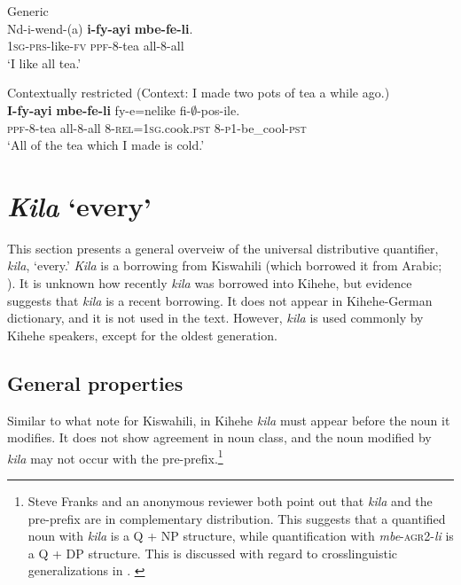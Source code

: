 \documentclass[output=paper,modfonts,nonflat]{langsci/langscibook}
\begin{document}
\begin{exe}

\ex \begin{xlist} \label{ex:kaspercushman:drinktea}
\ex Generic\\
\gll Nd-i-wend-(a) \textbf{i-fy-ayi} \textbf{mbe-fe-li}. \\
\textsc{1sg}-\textsc{prs}-like-\textsc{fv} \textsc{ppf}-8-tea all-8-all \\
\glt `I like all tea.'

\ex Contextually restricted (Context: I made two pots of tea a while ago.)\\
\gll \textbf{I-fy-ayi} \textbf{mbe-fe-li} fy-e=nelike fi-$\emptyset$-pos-ile. \\
\textsc{ppf}-8-tea all-8-all 8-\textsc{rel}=\textsc{1sg}.cook.\textsc{pst} 8-\textsc{p1}-be\_cool-\textsc{pst} \\
\glt `All of the tea which I made is cold.' 

\end{xlist}
\end{exe}



\section{\emph{Kila} `every'} \label{sec:kaspercushman:every}\label{sec:kasper:3}
This section presents a general overveiw of the universal distributive quantifier, \textit{kila}, `every.' \textit{Kila} is a borrowing from Kiswahili (which borrowed it from Arabic; \citealt{zerbian08}). It is unknown how recently \textit{kila} was borrowed into Kihehe, but evidence suggests that \textit{kila} is a recent borrowing. It does not appear in  Kihehe-German dictionary, and it is not used in the \citeauthor{Luwuko2011} text. However, \textit{kila} is used commonly by Kihehe speakers, except for the oldest generation.

\subsection{General properties}

Similar to what \cite{zerbian08} note for Kiswahili, in Kihehe \textit{kila} must appear before the noun it modifies. It does not show agreement in noun class, and the noun modified by \textit{kila} may not occur with the pre-prefix.\footnote{Steve
    Franks and an anonymous reviewer both point out that \textit{kila} and the pre-prefix are in complementary distribution.  This suggests that a quantified noun with \textit{kila} is a Q + NP structure, while quantification with \textit{mbe}-\textsc{agr2}-\textit{li} is a Q + DP structure. This is discussed with regard to crosslinguistic generalizations in . \label{foot:kaspercushman:1}
}
\end{document}
